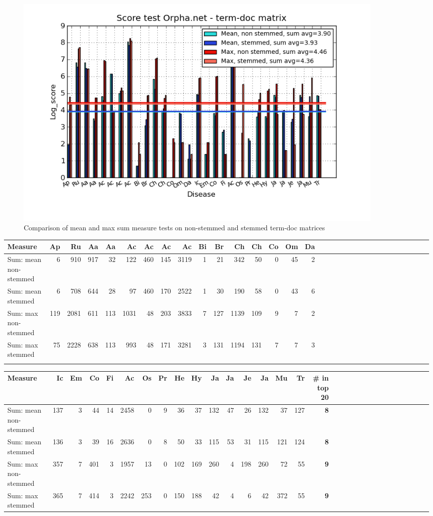 \begin{figure}[H]
        \begin{center}
          \includegraphics[width=0.9\textwidth]{barcharts/termDoc_orphan_hist_3000_ns_s_mea_max_sum.png}
        \end{center}
        \caption{Comparison of mean and max sum measure tests on non-stemmed and stemmed term-doc matrices}
        \label{termDoc_orphan_hist_3000_ns_s_mea_max_sum}
\end{figure} 

\begin{table}[H]
\begin{tiny}
  \begin{tabular}{|l|r|r|r|r|r|r|r|r|r|r|r|r|r|r|r|r|r|r|r|r|r|r|r|r|r|r|r|r|r|r|r|}
    \hline
    Measure &Ap&Ru&Aa&Aa&Ac&Ac&Ac&Ac&Bi&Br&Ch&Ch&Co&Om&Da\\
    \hline
    Sum: mean non-stemmed &6&910&917&32&122&460&145&3119&1&21&342&50&0&45&2\\
    \hline
    Sum: mean stemmed &6&708&644&28&97&460&170&2522&1&30&190&58&0&43&6\\
    \hline
    Sum: max non-stemmed &119&2081&611&113&1031&48&203&3833&7&127&1139&109&9&7&2\\
    \hline
    Sum: max stemmed &75&2228&638&113&993&48&171&3281&3&131&1194&131&7&7&3 \\
    \hline
    \multicolumn{16}{c}{} \\
    \end{tabular}
    \begin{tabular}{|l|r|r|r|r|r|r|r|r|r|r|r|r|r|r|r|r|r|r|r|r|r|r|r|r|r|r|r|r|r|r|}
    \hline
     Measure &Ic&Em&Co&Fi&Ac&Os&Pr&He&Hy&Ja&Ja&Je&Ja&Mu&Tr &\scriptsize{\textbf{\# in top 20}} \\
    \hline
    Sum: mean non-stemmed &137&3&44&14&2458&0&9&36&37&132&47&26&132&37&127 & \scriptsize{\textbf{8}} \\
    \hline
    Sum: mean stemmed &136&3&39&16&2636&0&8&50&33&115&53&31&115&121&124 & \scriptsize{\textbf{8}} \\
    \hline
    Sum: max non-stemmed &357&7&401&3&1957&13&0&102&169&260&4&198&260&72&55 & \scriptsize{\textbf{9}} \\
    \hline
    Sum: max stemmed &365&7&414&3&2242&253&0&150&188&42&4&6&42&372&55 & \scriptsize{\textbf{9}} \\
    \hline
  \end{tabular}
\end{tiny}
\end{table}

